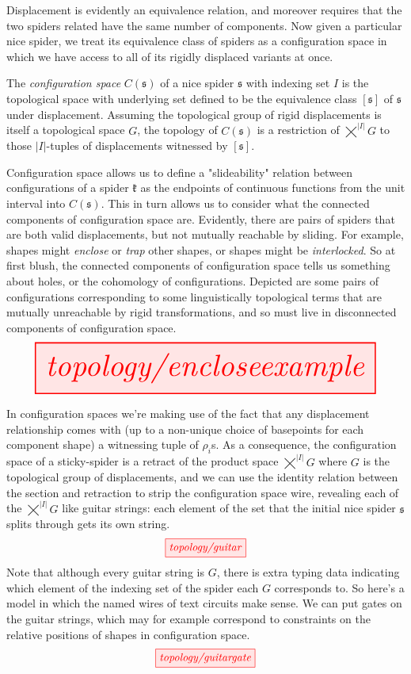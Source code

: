 Displacement is evidently an equivalence relation, and moreover requires that the two spiders related have the same number of components. Now given a particular nice spider, we treat its equivalence class of spiders as a configuration space in which we have access to all of its rigidly displaced variants at once.

\begin{defn}\label{defn:configurationspace}
The \emph{configuration space} $C(\mathfrak{s})$ of a nice spider $\mathfrak{s}$ with indexing set $I$ is the topological space with underlying set defined to be the equivalence class $[\mathfrak{s}]$ of $\mathfrak{s}$ under displacement. Assuming the topological group of rigid displacements is itself a topological space $G$, the topology of $C(\mathfrak{s})$ is a restriction of $\bigtimes^{|I|} G$ to those $|I|$-tuples of displacements witnessed by $[\mathfrak{s}]$.
\end{defn}

\begin{example}
Configuration space allows us to define a "slideability" relation between configurations of a spider $\mathfrak{k}$ as the endpoints of continuous functions from the unit interval into $C(\mathfrak{s})$. This in turn allows us to consider what the connected components of configuration space are. Evidently, there are pairs of spiders that are both valid displacements, but not mutually reachable by sliding. For example, shapes might \emph{enclose} or \emph{trap} other shapes, or shapes might be \emph{interlocked}. So at first blush, the connected components of configuration space tells us something about holes, or the cohomology of configurations. Depicted are some pairs of configurations corresponding to some linguistically topological terms that are mutually unreachable by rigid transformations, and so must live in disconnected components of configuration space.
\[\resizebox{\textwidth}{!}{\tikzfig{topology/encloseexample}}\]
\end{example}

In configuration spaces we're making use of the fact that any displacement relationship comes with (up to a non-unique choice of basepoints for each component shape)  a witnessing tuple of $\rho_i$s. As a consequence, the configuration space of a sticky-spider is a retract of the product space $\bigtimes^{|I|} G$ where $G$ is the topological group of displacements, and we can use the identity relation between the section and retraction to strip the configuration space wire, revealing each of the $\bigtimes^{|I|} G$ like guitar strings: each element of the set that the initial nice spider $\mathfrak{s}$ splits through gets its own string.
\[\tikzfig{topology/guitar}\]
Note that although every guitar string is $G$, there is extra typing data indicating which element of the indexing set of the spider each $G$ corresponds to. So here's a model in which the named wires of text circuits make sense. We can put gates on the guitar strings, which may for example correspond to constraints on the relative positions of shapes in configuration space.
\[\tikzfig{topology/guitargate}\]

